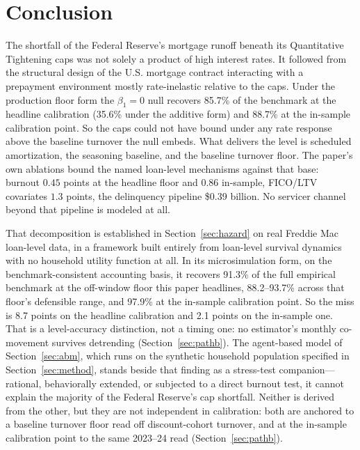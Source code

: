 \section{Conclusion}\label{sec:conclusion}

The shortfall of the Federal Reserve's mortgage runoff beneath its Quantitative Tightening caps was not solely a product of high interest rates. It followed from the structural design of the U.S. mortgage contract interacting with a prepayment environment mostly rate-inelastic relative to the caps. Under the production floor form the $\beta_1 = 0$ null recovers 85.7\% of the benchmark at the headline calibration (35.6\% under the additive form) and 88.7\% at the in-sample calibration point. So the caps could not have bound under any rate response above the baseline turnover the null embeds. What delivers the level is scheduled amortization, the seasoning baseline, and the baseline turnover floor. The paper's own ablations bound the named loan-level mechanisms against that base: burnout $0.45$ points at the headline floor and $0.86$ in-sample, FICO/LTV covariates $1.3$ points, the delinquency pipeline \$0.39 billion. No servicer channel beyond that pipeline is modeled at all.

That decomposition is established in Section~\ref{sec:hazard} on real Freddie Mac loan-level data, in a framework built entirely from loan-level survival dynamics with no household utility function at all. In its microsimulation form, on the benchmark-consistent accounting basis, it recovers 91.3\% of the full empirical benchmark at the off-window floor this paper headlines, 88.2--93.7\% across that floor's defensible range, and 97.9\% at the in-sample calibration point. So the miss is 8.7 points on the headline calibration and 2.1 points on the in-sample one. That is a level-accuracy distinction, not a timing one: no estimator's monthly co-movement survives detrending (Section~\ref{sec:pathb}). The agent-based model of Section~\ref{sec:abm}, which runs on the synthetic household population specified in Section~\ref{sec:method}, stands beside that finding as a stress-test companion---rational, behaviorally extended, or subjected to a direct burnout test, it cannot explain the majority of the Federal Reserve's cap shortfall. Neither is derived from the other, but they are not independent in calibration: both are anchored to a baseline turnover floor read off discount-cohort turnover, and at the in-sample calibration point to the same 2023--24 read (Section~\ref{sec:pathb}).

